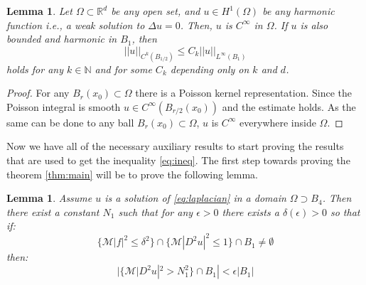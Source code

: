 \documentclass[12pt]{artikel1}
\newtheorem{lemma}[theorem]{Lemma}
\begin{document}
\begin{lemma}\label{lemma:int-reg}
    Let $\Omega\subset\mathbb{R}^d$ be any open set, and $u\in H^1(\Omega)$ be any harmonic function i.e., a weak solution to $\Delta u=0$. Then, $u$ is $C^\infty$ in $\Omega$. If $u$ is also bounded and harmonic in $B_1$, then
    \begin{equation*}
        ||u||_{C^k(B_{1/2})}\leq C_k||u||_{L^\infty(B_1)}
    \end{equation*}
    holds for any $k\in\mathbb{N}$ and for some $C_k$ depending only on $k$ and $d$.
\end{lemma}
\begin{proof}
    For any $B_r(x_0)\subset\Omega$ there is a Poisson kernel representation. Since the Poisson integral is smooth $u\in C^\infty(B_{r/2}(x_0))$ and the estimate holds. As the same can be done to any ball $B_r(x_0)\subset\Omega$, $u$ is $C^\infty$ everywhere inside $\Omega$.
\end{proof}

Now we have all of the necessary auxiliary results to start proving the results that are used to get the inequality \ref{eq:ineq}. The first step towards proving the theorem \ref{thm:main} will be to prove the following lemma.

\begin{lemma}\label{lemma:first-main}
    Assume $u$ is a solution of \ref{eq:laplacian} in a domain $\Omega\supset B_4$. Then there exist a constant $N_1$ such that for any $\epsilon>0$ there exists a $\delta(\epsilon)>0$ so that if:
    \begin{equation}\label{eq:lemma55eq1}
        \{\mathcal{M}|f|^2\leq\delta^2\}\cap\{\mathcal{M}|D^2u|^2\leq1\}\cap B_1\neq\emptyset
    \end{equation}
    then:
    \begin{equation}\label{eq:lemma55eq2}
        |\{\mathcal{M}|D^2u|^2>N_1^2\}\cap B_1|<\epsilon|B_1|
    \end{equation}
\end{lemma}
\end{document}
